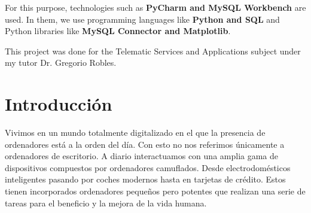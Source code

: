 \documentclass[a4paper, 12pt]{book}
\begin{document}
For this purpose, technologies such as \textbf{PyCharm and MySQL Workbench} are used.
In them, we use programming languages like \textbf{Python and SQL} and Python libraries like \textbf{MySQL Connector and Matplotlib}.

This project was done for the Telematic Services and Applications subject under my tutor Dr. Gregorio Robles.




\tableofcontents 
\cleardoublepage
\listoffigures %



\cleardoublepage
\chapter{Introducción}
\label{sec:intro} %

Vivimos en un mundo totalmente digitalizado en el que la presencia de ordenadores está a la orden del día. Con esto no nos referimos únicamente a ordenadores de escritorio. A diario interactuamos con una amplia gama de dispositivos compuestos por ordenadores camuflados. Desde electrodomésticos inteligentes pasando por coches modernos hasta en tarjetas de crédito. Estos tienen incorporados ordenadores pequeños pero potentes que realizan una serie de tareas para el beneficio y la mejora de la vida humana.
\end{document}
